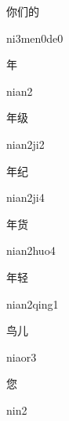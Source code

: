 \begin{multicols*}{2}
\begin{verbete}[ni3men0de0]{你们的}
\begin{pronuncia}{ni3men0de0}
\end{pronuncia}
\end{verbete}

\begin{verbete}[nian2]{年}
\begin{pronuncia}{nian2}
\end{pronuncia}
\end{verbete}

\begin{verbete}[nian2ji2]{年级}
\begin{pronuncia}{nian2ji2}
\end{pronuncia}
\end{verbete}

\begin{verbete}[nian2ji4]{年纪}
\begin{pronuncia}{nian2ji4}
\end{pronuncia}
\end{verbete}

\begin{verbete}{年货}
\begin{pronuncia}{nian2huo4}
\end{pronuncia}
\end{verbete}

\begin{verbete}{年轻}
\begin{pronuncia}{nian2qing1}
\end{pronuncia}
\end{verbete}

\begin{verbete}[niaor3]{鸟儿}
\begin{pronuncia}{niaor3}
\end{pronuncia}
\end{verbete}

\begin{verbete}[nin2]{您}
\begin{pronuncia}{nin2}
\end{pronuncia}
\end{verbete}


\end{multicols*}

